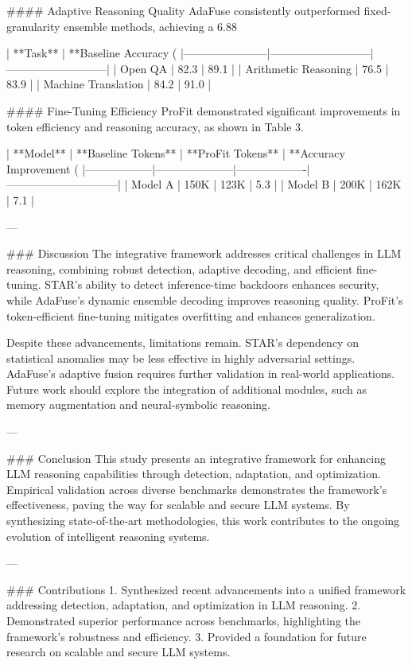 #### Adaptive Reasoning Quality
AdaFuse consistently outperformed fixed-granularity ensemble methods, achieving a 6.88%

| **Task**             | **Baseline Accuracy (%
|-----------------------|---------------------------|---------------------------|
| Open QA              | 82.3                      | 89.1                      |
| Arithmetic Reasoning | 76.5                      | 83.9                      |
| Machine Translation  | 84.2                      | 91.0                      |

#### Fine-Tuning Efficiency
ProFit demonstrated significant improvements in token efficiency and reasoning accuracy, as shown in Table 3.

| **Model**       | **Baseline Tokens** | **ProFit Tokens** | **Accuracy Improvement (%
|------------------|---------------------|-------------------|------------------------------|
| Model A         | 150K                | 123K              | 5.3                          |
| Model B         | 200K                | 162K              | 7.1                          |

---

### Discussion
The integrative framework addresses critical challenges in LLM reasoning, combining robust detection, adaptive decoding, and efficient fine-tuning. STAR's ability to detect inference-time backdoors enhances security, while AdaFuse's dynamic ensemble decoding improves reasoning quality. ProFit's token-efficient fine-tuning mitigates overfitting and enhances generalization.

Despite these advancements, limitations remain. STAR's dependency on statistical anomalies may be less effective in highly adversarial settings. AdaFuse's adaptive fusion requires further validation in real-world applications. Future work should explore the integration of additional modules, such as memory augmentation and neural-symbolic reasoning.

---

### Conclusion
This study presents an integrative framework for enhancing LLM reasoning capabilities through detection, adaptation, and optimization. Empirical validation across diverse benchmarks demonstrates the framework's effectiveness, paving the way for scalable and secure LLM systems. By synthesizing state-of-the-art methodologies, this work contributes to the ongoing evolution of intelligent reasoning systems.

---

### Contributions
1. Synthesized recent advancements into a unified framework addressing detection, adaptation, and optimization in LLM reasoning.
2. Demonstrated superior performance across benchmarks, highlighting the framework's robustness and efficiency.
3. Provided a foundation for future research on scalable and secure LLM systems.

